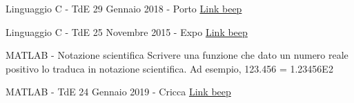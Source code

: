 \documentclass[aspectratio=169,]{beamer}
\begin{document}
\begin{frame}{Linguaggio C - TdE 29 Gennaio 2018 - Porto}
    \href{https://beep.metid.polimi.it/documents/3344342/8fb18de1-9394-4d6c-8d6f-6fd71aaa8070}{Link beep}
\end{frame}

\begin{frame}{Linguaggio C - TdE 25 Novembre 2015 - Expo}
    \href{https://beep.metid.polimi.it/documents/3344342/6f860c60-d096-4001-9dbe-454325e5f1fc}{Link beep}
\end{frame}

\begin{frame}{MATLAB - Notazione scientifica}
    Scrivere una funzione che dato un numero reale positivo lo traduca in notazione scientifica.
    Ad esempio, 123.456 = 1.23456E2
\end{frame}

\begin{frame}{MATLAB - TdE 24 Gennaio 2019 - Cricca}
    \href{https://beep.metid.polimi.it/documents/3344342/a4de0b73-df3b-447c-8fd6-c7a7c8676e79}{Link beep}
\end{frame}
\end{document}
